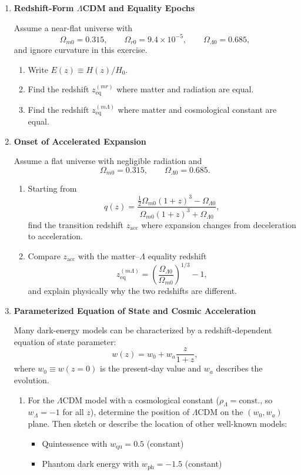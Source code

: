 \begin{enumerate}[label=3.\arabic*]
  \item \label{q:3.4} \textbf{Redshift-Form $\Lambda$CDM and Equality Epochs}

  Assume a near-flat universe with
  \[
    \Omega_{m0}=0.315,\qquad
    \Omega_{r0}=9.4\times10^{-5},\qquad
    \Omega_{\Lambda0}=0.685,
  \]
  and ignore curvature in this exercise.
  \begin{enumerate}[label=(\alph*)]
    \item Write $E(z)\equiv H(z)/H_0$.
    \item Find the redshift $z_{\mathrm{eq}}^{(mr)}$ where matter and radiation are equal.
    \item Find the redshift $z_{\mathrm{eq}}^{(m\Lambda)}$ where matter and cosmological constant are equal.
  \end{enumerate}

  \item \label{q:3.5} \textbf{Onset of Accelerated Expansion}

  Assume a flat universe with negligible radiation and
  \[
    \Omega_{m0}=0.315,\qquad \Omega_{\Lambda0}=0.685.
  \]
  \begin{enumerate}[label=(\alph*)]
    \item Starting from
    \[
      q(z)=\frac{\frac12\Omega_{m0}(1+z)^3-\Omega_{\Lambda0}}{\Omega_{m0}(1+z)^3+\Omega_{\Lambda0}},
    \]
    find the transition redshift $z_{\mathrm{acc}}$ where expansion changes from deceleration to acceleration.
    \item Compare $z_{\mathrm{acc}}$ with the matter--$\Lambda$ equality redshift
    \[
      z_{\mathrm{eq}}^{(m\Lambda)}=\left(\frac{\Omega_{\Lambda0}}{\Omega_{m0}}\right)^{1/3}-1,
    \]
    and explain physically why the two redshifts are different.
  \end{enumerate}

  \item \label{q:3.6} \textbf{Parameterized Equation of State and Cosmic Acceleration}

  Many dark-energy models can be characterized by a redshift-dependent equation of state parameter:
  \[
    w(z) = w_0 + w_a \frac{z}{1+z},
  \]
  where $w_0\equiv w(z=0)$ is the present-day value and $w_a$ describes the evolution.
  
  \begin{enumerate}[label=(\alph*)]
    \item 
    For the $\Lambda$CDM model with a cosmological constant ($\rho_\Lambda = \text{const.}$, so $w_\Lambda = -1$ for all $z$), determine the position of $\Lambda$CDM on the $(w_0, w_a)$ plane. Then sketch or describe the location of other well-known models:
    \begin{itemize}
      \item Quintessence with $w_\text{qu} = 0.5$ (constant)
      \item Phantom dark energy with $w_\text{ph}=-1.5$ (constant)
    \end{itemize}
    

\end{enumerate}
\end{enumerate}
